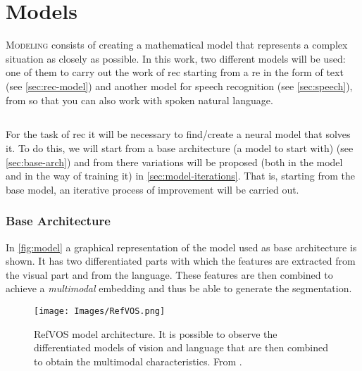 

\chapter{Models}\label{cha:model}



\lettrine{M}{odeling} consists of creating a mathematical model that represents
a complex situation as closely as possible. In this work, two different models
will be used: one of them to carry out the work of \gls{rec} starting from a
\gls{re} in the form of text (see \vref{sec:rec-model}) and another model for
speech recognition (see \vref{sec:speech}), from so that you can also work with
spoken natural language.


\section{}\label{sec:rec-model}

For the task of \gls{rec} it will be necessary to find/create a neural model
that solves it. To do this, we will start from a base architecture (a model to
start with) (see \vref{sec:base-arch}) and from there variations will be
proposed (both in the model and in the way of training it) in
\vref{sec:model-iterations}. That is, starting from the base model, an
iterative process of improvement will be carried out.

\subsection{Base Architecture}\label{sec:base-arch}

In \vref{fig:model} a graphical representation of the model used as base
architecture is shown. It has two differentiated parts with which the features
are extracted from the visual part and from the language. These features are
then combined to achieve a \emph{multimodal} embedding and thus be able to
generate the segmentation.

\begin{figure}[ht]
  \centering
  \texttt{[image: Images/RefVOS.png]}
  \caption[RefVOS model architecture]{RefVOS model architecture. It is possible
    to observe the differentiated models of vision and language that are then
    combined to obtain the multimodal characteristics. From
    .}\label{fig:model}
\end{figure}

